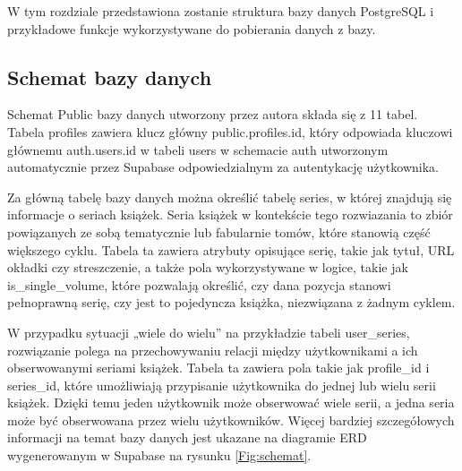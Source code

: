 \documentclass[12pt,twoside]{article}
\begin{document}
W tym rozdziale przedstawiona zostanie struktura bazy danych PostgreSQL i przykładowe funkcje wykorzystywane do 
pobierania danych z bazy.

\subsection{Schemat bazy danych}

Schemat Public bazy danych utworzony przez autora składa się z 11 tabel. Tabela profiles zawiera klucz główny 
public.profiles.id, który odpowiada kluczowi głównemu auth.users.id w tabeli users w schemacie auth utworzonym 
automatycznie przez Supabase odpowiedzialnym za autentykację użytkownika.

Za główną tabelę bazy danych można określić tabelę series, w której znajdują się informacje o seriach książek.
Seria książek w kontekście tego rozwiazania to zbiór powiązanych ze sobą tematycznie lub fabularnie tomów, które
stanowią część większego cyklu. Tabela ta zawiera atrybuty opisujące serię, takie jak tytuł, URL okładki czy 
streszczenie, a także pola wykorzystywane w logice, takie jak is\_single\_volume, które pozwalają określić, czy dana 
pozycja stanowi pełnoprawną serię, czy jest to pojedyncza książka, niezwiązana z żadnym cyklem.

W przypadku sytuacji „wiele do wielu” na przykładzie tabeli user\_series, rozwiązanie polega na przechowywaniu relacji 
między użytkownikami a ich obserwowanymi seriami książek. Tabela ta zawiera pola takie jak profile\_id i series\_id, 
które umożliwiają przypisanie użytkownika do jednej lub wielu serii książek. Dzięki temu jeden użytkownik może obserwować
wiele serii, a jedna seria może być obserwowana przez wielu użytkowników. Więcej bardziej szczegółowych informacji
na temat bazy danych jest ukazane na diagramie ERD wygenerowanym w Supabase na rysunku \ref{Fig:schemat}.
\end{document}
